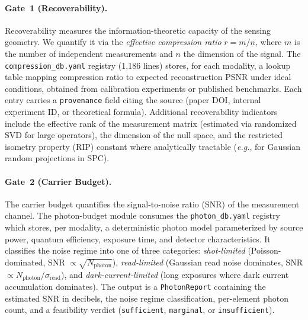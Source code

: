 \documentclass[11pt]{article}
\newcommand{\eg}{\textit{e.g.}}
\begin{document}
\paragraph{Gate~1 (Recoverability).}
Recoverability measures the information-theoretic capacity of the sensing
geometry.  We quantify it via the \emph{effective compression ratio}
$r = m / n$, where $m$ is the number of independent measurements and $n$
the dimension of the signal.  The \texttt{compression\_db.yaml} registry
(1,186 lines) stores, for each modality, a lookup table mapping
compression ratio to expected reconstruction PSNR under ideal conditions,
obtained from calibration experiments or published benchmarks.  Each entry
carries a \texttt{provenance} field citing the source (paper DOI, internal
experiment ID, or theoretical formula).  Additional recoverability
indicators include the effective rank of the measurement matrix (estimated
via randomized SVD for large operators), the dimension of the null space,
and the restricted isometry property (RIP) constant where analytically
tractable (\eg{}, for Gaussian random projections in SPC).

\paragraph{Gate~2 (Carrier Budget).}
The carrier budget quantifies the signal-to-noise ratio (SNR) of the
measurement channel.  The photon-budget module consumes the
\texttt{photon\_db.yaml} registry which stores, per modality,
a deterministic photon model parameterized by source power, quantum
efficiency, exposure time, and detector characteristics.  It
classifies the noise regime into one of three categories:
\emph{shot-limited} (Poisson-dominated, SNR $\propto \sqrt{N_{\text{photon}}}$),
\emph{read-limited} (Gaussian read noise dominates, SNR $\propto
N_{\text{photon}} / \sigma_{\text{read}}$), and \emph{dark-current-limited}
(long exposures where dark current accumulation dominates).  The output is
a \texttt{PhotonReport} containing the estimated SNR in decibels, the noise
regime classification, per-element photon count, and a feasibility verdict
(\texttt{sufficient}, \texttt{marginal}, or \texttt{insufficient}).
\end{document}
